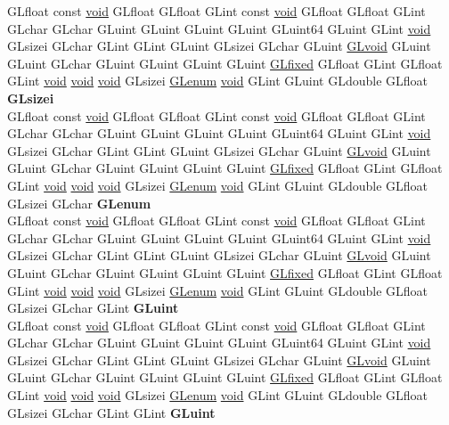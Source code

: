 \begin{DoxyCompactItemize}
\begin{tabbing}
\>GLfloat const \hyperlink{interfacevoid}{void} GLfloat GLfloat GLint const \hyperlink{interfacevoid}{void} GLfloat GLfloat GLint GLchar GLchar GLuint GLuint GLuint GLuint GLuint64 GLuint GLint \hyperlink{interfacevoid}{void} GLsizei GLchar GLint GLint GLuint GLsizei GLchar GLuint \hyperlink{interfacevoid}{GLvoid} GLuint GLuint GLchar GLuint GLuint GLuint GLuint \hyperlink{glheader_8h_ad6d3fa892df40dedf48ee6d84529ae5e}{GLfixed} GLfloat GLint GLfloat GLint \hyperlink{interfacevoid}{void} \hyperlink{interfacevoid}{void} \hyperlink{interfacevoid}{void} GLsizei \hyperlink{interfacevoid}{GLenum} \hyperlink{interfacevoid}{void} GLint GLuint GLdouble GLfloat {\bfseries GLsizei}\\
\>GLfloat const \hyperlink{interfacevoid}{void} GLfloat GLfloat GLint const \hyperlink{interfacevoid}{void} GLfloat GLfloat GLint GLchar GLchar GLuint GLuint GLuint GLuint GLuint64 GLuint GLint \hyperlink{interfacevoid}{void} GLsizei GLchar GLint GLint GLuint GLsizei GLchar GLuint \hyperlink{interfacevoid}{GLvoid} GLuint GLuint GLchar GLuint GLuint GLuint GLuint \hyperlink{glheader_8h_ad6d3fa892df40dedf48ee6d84529ae5e}{GLfixed} GLfloat GLint GLfloat GLint \hyperlink{interfacevoid}{void} \hyperlink{interfacevoid}{void} \hyperlink{interfacevoid}{void} GLsizei \hyperlink{interfacevoid}{GLenum} \hyperlink{interfacevoid}{void} GLint GLuint GLdouble GLfloat GLsizei GLchar {\bfseries GLenum}\\
\>GLfloat const \hyperlink{interfacevoid}{void} GLfloat GLfloat GLint const \hyperlink{interfacevoid}{void} GLfloat GLfloat GLint GLchar GLchar GLuint GLuint GLuint GLuint GLuint64 GLuint GLint \hyperlink{interfacevoid}{void} GLsizei GLchar GLint GLint GLuint GLsizei GLchar GLuint \hyperlink{interfacevoid}{GLvoid} GLuint GLuint GLchar GLuint GLuint GLuint GLuint \hyperlink{glheader_8h_ad6d3fa892df40dedf48ee6d84529ae5e}{GLfixed} GLfloat GLint GLfloat GLint \hyperlink{interfacevoid}{void} \hyperlink{interfacevoid}{void} \hyperlink{interfacevoid}{void} GLsizei \hyperlink{interfacevoid}{GLenum} \hyperlink{interfacevoid}{void} GLint GLuint GLdouble GLfloat GLsizei GLchar GLint {\bfseries GLuint}\\
\>GLfloat const \hyperlink{interfacevoid}{void} GLfloat GLfloat GLint const \hyperlink{interfacevoid}{void} GLfloat GLfloat GLint GLchar GLchar GLuint GLuint GLuint GLuint GLuint64 GLuint GLint \hyperlink{interfacevoid}{void} GLsizei GLchar GLint GLint GLuint GLsizei GLchar GLuint \hyperlink{interfacevoid}{GLvoid} GLuint GLuint GLchar GLuint GLuint GLuint GLuint \hyperlink{glheader_8h_ad6d3fa892df40dedf48ee6d84529ae5e}{GLfixed} GLfloat GLint GLfloat GLint \hyperlink{interfacevoid}{void} \hyperlink{interfacevoid}{void} \hyperlink{interfacevoid}{void} GLsizei \hyperlink{interfacevoid}{GLenum} \hyperlink{interfacevoid}{void} GLint GLuint GLdouble GLfloat GLsizei GLchar GLint GLint {\bfseries GLuint}\\

\end{tabbing}
\end{DoxyCompactItemize}
